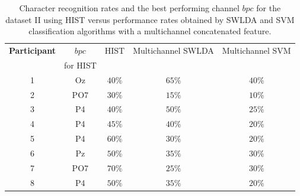 \begin{table}[h!]
\caption[Dataset II - Comparisons of Character Recognition Rates]{Character recognition rates and the best performing channel $bpc$ for the  dataset II  using HIST versus performance rates obtained by SWLDA and SVM classification algorithms with a multichannel concatenated feature.}
\centering
\begin{tabular}{c|cc|c|c}
\toprule
\textbf{Participant}	&  $bpc$ 	&  HIST & Multichannel SWLDA & Multichannel SVM  \\
                                    &  for HIST        &           &                                       &   \\
\midrule
1     &     Oz   &     $40\%$  &     $65\%$  &     $40\%$ \\
2     &     PO7   &     $30\%$ &   $15\%$  &     $10\%$ \\
3     &     P4   &     $40\%$ &     $50\%$  &     $25\%$ \\
4     &     P4   &     $45\%$ &     $40\%$  &     $20\%$ \\
5     &     P4   &      $60\%$ &    $30\%$  &     $20\%$ \\
6     &     Pz   &      $50\%$ &    $35\%$  &     $30\%$ \\
7     &     PO7   &      $70\%$ &  $25\%$  &     $30\%$ \\
8     &     P4   &      $50\%$ &    $35\%$  &     $20\%$ \\

\end{tabular}
\label{tab:resultsownswlda}
\end{table}

 

